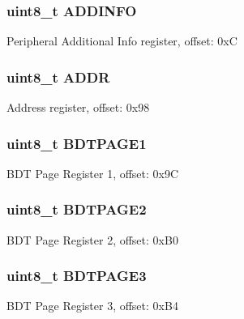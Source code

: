 \subsubsection[{A\+D\+D\+I\+N\+F\+O}]{\setlength{\rightskip}{0pt plus 5cm}uint8\+\_\+t A\+D\+D\+I\+N\+F\+O}\label{struct_u_s_b___mem_map_aa53fb603c9949324b88be8514f856671}
Peripheral Additional Info register, offset\+: 0x\+C \hypertarget{struct_u_s_b___mem_map_a0fd6ec93b02d527aefd5261b50b1996c}{}
\subsubsection[{A\+D\+D\+R}]{\setlength{\rightskip}{0pt plus 5cm}uint8\+\_\+t A\+D\+D\+R}\label{struct_u_s_b___mem_map_a0fd6ec93b02d527aefd5261b50b1996c}
Address register, offset\+: 0x98 \hypertarget{struct_u_s_b___mem_map_a679d092c2b3e0582861947b4351e5354}{}
\subsubsection[{B\+D\+T\+P\+A\+G\+E1}]{\setlength{\rightskip}{0pt plus 5cm}uint8\+\_\+t B\+D\+T\+P\+A\+G\+E1}\label{struct_u_s_b___mem_map_a679d092c2b3e0582861947b4351e5354}
B\+D\+T Page Register 1, offset\+: 0x9\+C \hypertarget{struct_u_s_b___mem_map_a711a77940dfc60f1b1990ea745cb3429}{}
\subsubsection[{B\+D\+T\+P\+A\+G\+E2}]{\setlength{\rightskip}{0pt plus 5cm}uint8\+\_\+t B\+D\+T\+P\+A\+G\+E2}\label{struct_u_s_b___mem_map_a711a77940dfc60f1b1990ea745cb3429}
B\+D\+T Page Register 2, offset\+: 0x\+B0 \hypertarget{struct_u_s_b___mem_map_af12ff3314d98e240d839662ea10c7efb}{}
\subsubsection[{B\+D\+T\+P\+A\+G\+E3}]{\setlength{\rightskip}{0pt plus 5cm}uint8\+\_\+t B\+D\+T\+P\+A\+G\+E3}\label{struct_u_s_b___mem_map_af12ff3314d98e240d839662ea10c7efb}
B\+D\+T Page Register 3, offset\+: 0x\+B4 \hypertarget{struct_u_s_b___mem_map_a07245e0c99405baca05af69e6890b05b}{}
